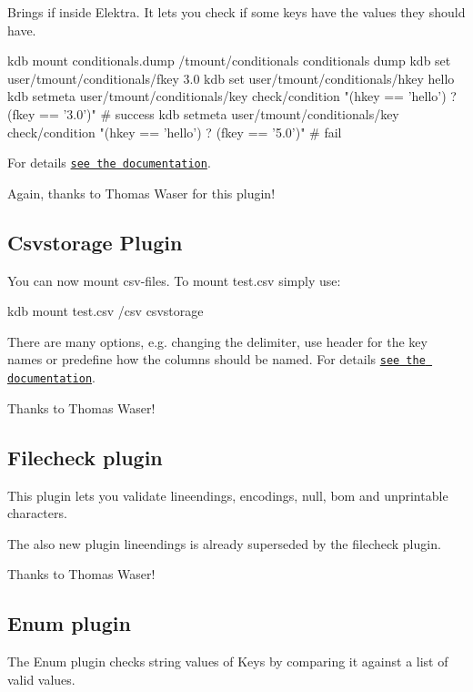 Brings {\ttfamily if} inside Elektra. It lets you check if some keys have the values they should have. \begin{DoxyVerb}    kdb mount conditionals.dump /tmount/conditionals conditionals dump
    kdb set user/tmount/conditionals/fkey 3.0
    kdb set user/tmount/conditionals/hkey hello
    kdb setmeta user/tmount/conditionals/key check/condition "(hkey == 'hello') ? (fkey == '3.0')" # success
    kdb setmeta user/tmount/conditionals/key check/condition "(hkey == 'hello') ? (fkey == '5.0')" # fail
\end{DoxyVerb}


For details \href{https://master.libelektra.org/src/plugins/conditionals/}{\tt see the documentation}.

Again, thanks to Thomas Waser for this plugin!

\subsection*{Csvstorage Plugin}

You can now mount csv-\/files. To mount {\ttfamily test.\+csv} simply use\+: \begin{DoxyVerb}kdb mount test.csv /csv csvstorage
\end{DoxyVerb}


There are many options, e.\+g. changing the delimiter, use header for the key names or predefine how the columns should be named. For details \href{https://master.libelektra.org/src/plugins/csvstorage/}{\tt see the documentation}.

Thanks to Thomas Waser!

\subsection*{Filecheck plugin}

This plugin lets you validate lineendings, encodings, null, bom and unprintable characters.

The also new plugin lineendings is already superseded by the filecheck plugin.

Thanks to Thomas Waser!

\subsection*{Enum plugin}

The Enum plugin checks string values of Keys by comparing it against a list of valid values.

